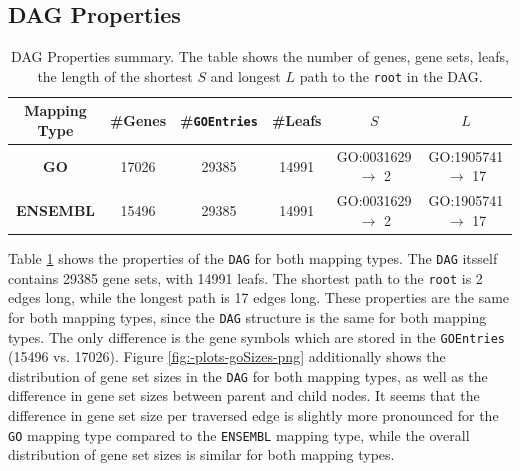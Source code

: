 \documentclass[12pt]{article}
\begin{document}
\subsection{DAG Properties}\label{sec:DAG-Properties}

\begin{table}[htpb]
    \centering
    \caption{DAG Properties summary. The table shows the number of genes, gene sets, leafs, the length of the shortest $S$ and longest $L$ path to the \texttt{root} in the DAG.}
    \label{tab:dag_properties}
\begin{tabular}{|c|c|c|c|c|c|} \hline
     \textbf{Mapping Type} & \#Genes & \#\texttt{GOEntries} & \#Leafs & $S$ & $L$ \\ \hline
     \textbf{GO} & 17026 & 29385 & 14991 & GO:0031629 $\to$ 2 & GO:1905741 $\to$ 17 \\ \hline
 \textbf{ENSEMBL} & 15496 & 29385 & 14991 & GO:0031629 $\to$ 2 & GO:1905741 $\to$ 17 \\ \hline
\end{tabular}
\end{table}

Table \ref{tab:dag_properties} shows the properties of the \texttt{DAG} for both mapping
types. The \texttt{DAG} itsself contains 29385 gene sets, with 14991 leafs. The shortest
path to the \texttt{root} is 2 edges long, while the longest path is 17 edges long.
These properties are the same for both mapping types, since the \texttt{DAG} structure is the
same for both mapping types. The only difference is the gene symbols which are stored in the \texttt{GOEntries} (15496 vs. 17026).
Figure \ref{fig:-plots-goSizes-png} additionally shows the distribution of gene set sizes in the \texttt{DAG} for both mapping types,
as well as the difference in gene set sizes between parent and child nodes.
It seems that the difference in gene set size per traversed edge is slightly more pronounced for the \texttt{GO} mapping type compared to the \texttt{ENSEMBL} mapping type,
while the overall distribution of gene set sizes is similar for both mapping types.
\end{document}
